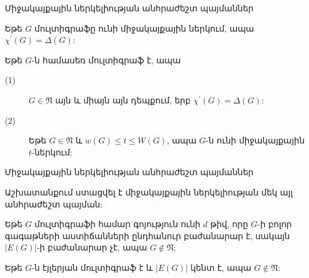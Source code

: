 
\begin{frame}{Միջակայքային ներկելիության անհրաժեշտ պայմաններ}

\begin{theorem}
Եթե $G$ մուլտիգրաֆը ունի միջակայքային ներկում, ապա $\chi^{\prime}(G)=\Delta(G)$:
\end{theorem}

\pause

\begin{theorem}
Եթե $G$-ն համասեռ մուլտիգրաֆ է, ապա
\begin{description}
\item[(1)] $G\in \mathfrak{N}$ այն և միայն այն դեպքում, երբ $\chi^{\prime}(G)=\Delta(G)$:
\item[(2)] Եթե $G\in \mathfrak{N}$ և $w(G)\leq t\leq W(G)$, ապա $G$-ն ունի միջակայքային $t$-ներկում:
\end{description}
\end{theorem}

\end{frame}

\begin{frame}{Միջակայքային ներկելիության անհրաժեշտ պայմաններ}

Աշխատանքում ստացվել է միջակայքային ներկելիության մեկ այլ անհրաժեշտ պայման:
\begin{theorem}[1.1.3]
Եթե $G$ մուլտիգրաֆի համար գոյություն ունի $d$ թիվ, որը $G$-ի բոլոր գագաթների աստիճանների ընդհանուր բաժանարար է, սակայն $\vert E(G)\vert$-ի բաժանարար չէ, ապա $G\notin \mathfrak{N}$:
\end{theorem}
\pause
\begin{corollary}[1.1.4]
Եթե $G$-ն էյլերյան մուլտիգրաֆ է և $\vert
E(G)\vert$ կենտ է, ապա $G\notin \mathfrak{N}$:
\end{corollary}
\end{frame}

